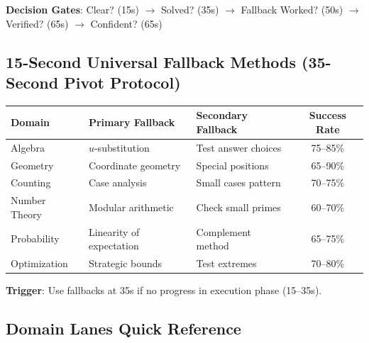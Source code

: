 \documentclass{article}
\begin{document}
\textbf{Decision Gates}: Clear? (15s) $\rightarrow$ Solved? (35s) $\rightarrow$ Fallback Worked? (50s) $\rightarrow$ Verified? (65s) $\rightarrow$ Confident? (65s)

\subsection{15-Second Universal Fallback Methods (35-Second Pivot Protocol)}

\begin{center}
\begin{tabular}{|l|l|l|c|}
\hline
\textbf{Domain} & \textbf{Primary Fallback} & \textbf{Secondary Fallback} & \textbf{Success Rate} \\
\hline
Algebra & $u$-substitution & Test answer choices & 75--85\% \\
Geometry & Coordinate geometry & Special positions & 65--90\% \\
Counting & Case analysis & Small cases pattern & 70--75\% \\
Number Theory & Modular arithmetic & Check small primes & 60--70\% \\
Probability & Linearity of expectation & Complement method & 65--75\% \\
Optimization & Strategic bounds & Test extremes & 70--80\% \\
\hline
\end{tabular}
\end{center}

\textbf{Trigger}: Use fallbacks at 35s if no progress in execution phase (15--35s).

\subsection{Domain Lanes Quick Reference}
\end{document}
